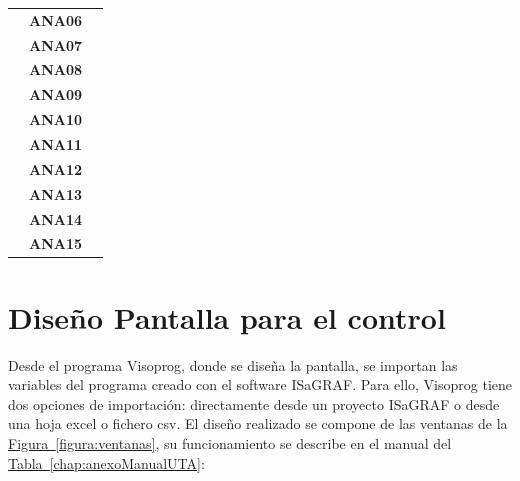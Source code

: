 \begin{center}
\begin{longtable}{|p{3cm}|p{3cm}|p{9cm}|}
      & \centering\textbf{ANA06} &  \\ \cline{2-2}
      & \centering\textbf{ANA07} &  \\ \cline{2-2}
      & \centering\textbf{ANA08} &  \\ \cline{2-2}
      & \centering\textbf{ANA09} &  \\ \cline{2-2}
      & \centering\textbf{ANA10} &  \\ \cline{2-2}
      & \centering\textbf{ANA11} &  \\ \cline{2-2}
      & \centering\textbf{ANA12} &  \\ \cline{2-2}
      & \centering\textbf{ANA13} &  \\ \cline{2-2}
      & \centering\textbf{ANA14} &  \\ \cline{2-2}
      & \centering\textbf{ANA15} &  \\ 
  \end{longtable}
  \end{center}

\section{Diseño Pantalla para el control}
\label{sec:programacionpantalla}
Desde el programa Visoprog, donde se diseña la pantalla, se importan las variables del programa creado con el software ISaGRAF. Para ello, Visoprog tiene dos opciones de importación: directamente desde un proyecto ISaGRAF o desde una hoja excel o fichero csv. El diseño realizado se compone de las ventanas de la \hyperref[figura:ventanas]{Figura~\ref{figura:ventanas}}, su funcionamiento se describe en el manual del \hyperref[chap:anexoManualUTA]{Tabla~\ref{chap:anexoManualUTA}}:

\begin{figure}[H]
  \centering
 \end{figure}

